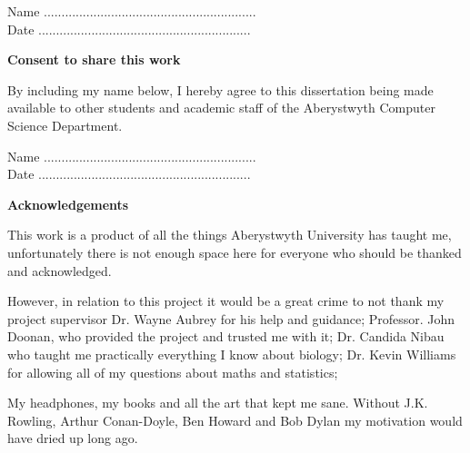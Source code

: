 \documentclass[11pt]{report}
\begin{document}
  \vspace{2em}
  Name ............................................................  \\

  \vspace{1em}
  Date ............................................................ \\

  \vspace{1em}
  \begin{center}
    {\LARGE\bf Consent to share this work}
  \end{center}

  By including my name below, I hereby agree to this dissertation being made available to other students and academic staff of the Aberystwyth Computer Science Department.

  \vspace{2em}
  Name ............................................................  \\

  \vspace{1em}
  Date ............................................................ \\

  \clearpage

  \thispagestyle{plain}

  \begin{center}
    {\LARGE\bf Acknowledgements}
  \end{center}

\vspace{3cm}

This work is a product of all the things Aberystwyth University has taught me, unfortunately
there is not enough space here for everyone who should be thanked and acknowledged.

\vspace{1cm}

However, in relation to this project it would be a great crime to not thank my project supervisor Dr. Wayne Aubrey for his help and guidance;
Professor. John Doonan, who provided the project and trusted me with it;
Dr. Candida Nibau who taught me practically everything I know about biology;  Dr. Kevin Williams for allowing all of my questions about maths and statistics;

\vspace{1cm}

My headphones, my books and all the art that kept me sane. Without J.K. Rowling, Arthur Conan-Doyle, Ben Howard and Bob Dylan my motivation would have dried up long ago.
\end{document}
